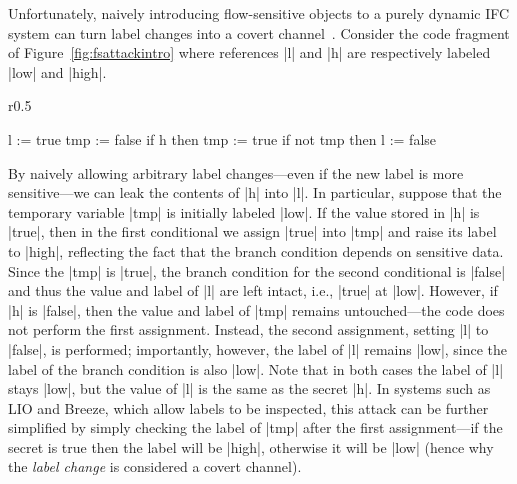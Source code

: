 Unfortunately, naively introducing flow-sensitive objects to a purely dynamic
IFC system can turn label changes into a covert channel~\cite{Russo:2010}. 
%
Consider the code fragment of Figure~\ref{fig:fsattackintro}
where references |l| and |h| are respectively labeled |low| and
|high|.
%
\begin{wrapfigure}{r}{0.5\columnwidth}
  \small
\begin{code}
l    := true
tmp  := false
if h then tmp := true
if not tmp then l := false
\end{code}
\vspace{-15pt}
\caption{\small\label{fig:fsattackintro} Flow-sensitive attack}
\end{wrapfigure}
%
By naively allowing arbitrary label changes---even if the new label is
more sensitive---we can leak the contents of |h| into |l|.
%
In particular, suppose that the temporary variable |tmp| is initially
labeled |low|.
%
If the value stored in |h| is |true|, then in the first conditional we
assign |true| into |tmp| and raise its label to |high|, reflecting the
fact that the branch condition depends on sensitive data.
%
Since the |tmp| is |true|, the branch condition for the second conditional is
|false| and thus the value and label of |l| are left intact, i.e., |true| at
|low|.
%
However, if |h| is |false|, then the value and label of |tmp| remains
untouched---the code does not perform the first assignment.
%
Instead, the second assignment, setting |l| to |false|, is performed;
importantly, however, the label of |l| remains |low|, since the label of the
branch condition is also |low|.
%
Note that in both cases the label of |l| stays |low|, but the value of |l| is
the same as the secret |h|.
%
In systems such as LIO and Breeze, which allow labels to be inspected, this
attack can be further simplified by simply checking the label of |tmp| after
the first assignment---if the secret is true then the label will be |high|,
otherwise it will be |low| (hence why the \emph{label change} is considered a
covert channel).

